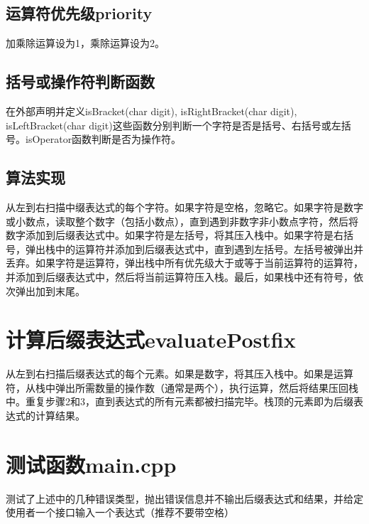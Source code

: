 \documentclass{article}
\begin{document}
\subsection{运算符优先级priority}加乘除运算设为1，乘除运算设为2。

\subsection{括号或操作符判断函数}在外部声明并定义isBracket(char digit), isRightBracket(char digit), isLeftBracket(char digit)这些函数分别判断一个字符是否是括号、右括号或左括号。isOperator函数判断是否为操作符。

\subsection{算法实现}从左到右扫描中缀表达式的每个字符。如果字符是空格，忽略它。如果字符是数字或小数点，读取整个数字（包括小数点），直到遇到非数字非小数点字符，然后将数字添加到后缀表达式中。如果字符是左括号，将其压入栈中。如果字符是右括号，弹出栈中的运算符并添加到后缀表达式中，直到遇到左括号。左括号被弹出并丢弃。如果字符是运算符，弹出栈中所有优先级大于或等于当前运算符的运算符，并添加到后缀表达式中，然后将当前运算符压入栈。最后，如果栈中还有符号，依次弹出加到末尾。

\section{计算后缀表达式evaluatePostfix}
从左到右扫描后缀表达式的每个元素。如果是数字，将其压入栈中。如果是运算符，从栈中弹出所需数量的操作数（通常是两个），执行运算，然后将结果压回栈中。重复步骤2和3，直到表达式的所有元素都被扫描完毕。栈顶的元素即为后缀表达式的计算结果。

\section{测试函数main.cpp}

测试了上述中的几种错误类型，抛出错误信息并不输出后缀表达式和结果，并给定使用者一个接口输入一个表达式（推荐不要带空格）
\end{document}
